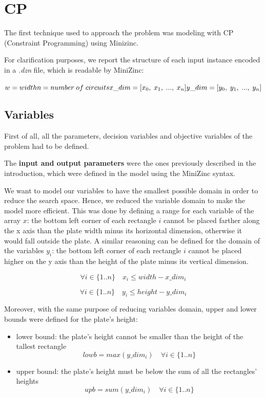 \section{CP}

The first technique used to approach the problem was modeling with CP (Constraint Programming) using Minizinc.

For clarification purposes, we report the structure of each input instance encoded in a \textit{.dzn} file, which is readable by MiniZinc:

$w = {width} \\
n = {number \; of \; circuits} \\
x\_dim = [{x_0}, \; {x_1}, \; ..., \; {x_n}] \\
y\_dim = [{y_0}, \; {y_1}, \; ..., \; {y_n}]$ 

\subsection{Variables}

First of all, all the parameters, decision variables and objective variables of the problem had to be defined. 

The \textbf{input and output parameters} were the ones previously described in the introduction, which were defined in the model using the MiniZinc syntax.

We want to model our variables to have the smallest possible domain in order to reduce the search space. Hence, we reduced the variable domain to make the model more efficient. This was done by defining a range for each variable of the array $x$: the bottom left corner of each rectangle $i$ cannot be placed farther along the x axis than the plate width minus its horizontal dimension, otherwise it would fall outside the plate. A similar reasoning can be defined for the domain of the variables $y_i$: the bottom left corner of each rectangle $i$ cannot be placed higher on the y axis than the height of the plate minus its vertical dimension.

\begin{equation*}
    \forall i \in \{1..n\} \quad x_i \leq width - x\_dim_i
\end{equation*}

\begin{equation*}
    \forall i \in \{1..n\} \quad y_i \leq height - y\_dim_i
\end{equation*}

Moreover, with the same purpose of reducing variables domain, upper and lower bounds were defined for the plate's height:
\begin{itemize}
    \item lower bound: the plate's height cannot be smaller than the height of the tallest rectangle
    \[ lowb = max(y\_dim_i) \quad \forall i \in \{1..n\}\]
    \item upper bound: the plate's height must be below the sum of all the rectangles' heights
    \[upb = sum(y\_dim_i) \quad \forall i \in \{1..n\} \]
\end{itemize}

